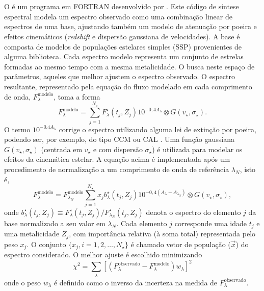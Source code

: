 \section{\STARLIGHT}
\label{sec:sample:SL}

O \starlight é um programa em FORTRAN desenvolvido por \citet{CidFernandes.etal.2005a}. Este código de síntese espectral modela um espectro observado como uma combinação linear de espectros de uma base, ajustando também um modelo de atenuação por poeira e efeitos cinemáticos ({\em redshift} e dispersão gaussiana de velocidades). A base é composta de modelos de populações estelares simples (SSP) provenientes de alguma biblioteca. Cada espectro modelo representa um conjunto de estrelas formadas ao mesmo tempo com a mesma metalicidade. O \starlight busca neste espaço de parâmetros, aqueles que melhor ajustem o espectro observado. O espectro resultante, representado pela equação do fluxo modelado em cada comprimento de onda, $F^{\mathrm{modelo}}_\lambda$, toma a forma
\begin{equation}
  F^{\mathrm{modelo}}_\lambda = \sum_{j=1}^{N_\star} F^\star_\lambda(t_j,Z_j) 10^{ -0,4 A_\lambda}  \otimes G(v_\star,\sigma_\star).
\end{equation}
\noindent O termo $10^{ -0.4 A_\lambda}$ corrige o espectro utilizando alguma lei de extinção por poeira, podendo ser, por exemplo, do tipo CCM \citep{CCM1989a} ou CAL \citep{Calzetti.etal.1994a}. Uma função gaussiana $G(v_\star,\sigma_\star)$ (centrada em $v_\star$ e com dispersão $\sigma_\star$) é utilizada para modelar os efeitos da cinemática estelar. A equação acima é implementada após um procedimento de normalização a um comprimento de onda de referência $\lambda_N$, isto é,
\begin{equation}
F^{\mathrm{modelo}}_\lambda = F^{\mathrm{modelo}}_{\lambda_N} \sum_{j=1}^{N_\star} x_j b^\star_\lambda(t_j,Z_j) 10^{ -0,4 (A_\lambda - A_{\lambda_N}) } \otimes G(v_\star,\sigma_\star),
\end{equation}
\noindent onde $b^\star_\lambda(t_j,Z_j) \equiv  F^\star_\lambda(t_j,Z_j) / F^\star_{\lambda_N}(t_j,Z_j)$ denota o espectro  do elemento $j$ da base normalizado a seu valor em $\lambda_N$. Cada elemento $j$ corresponde uma idade  $t_j$ e uma metalicidade $Z_j$, com importância relativa (à soma total) representada pelo peso $x_j$. O conjunto $\{x_j, i=1,2,\ldots,N_\star\}$ é chamado vetor de população ($\vec{x}$) do espectro considerado. O melhor ajuste é escolhido minimizando
\begin{equation}
\chi^2 = \sum_\lambda \left[(F^{\mathrm{observado}}_\lambda - F^{\mathrm{modelo}}_\lambda) w_\lambda\right]^2
\end{equation}
\noindent onde o peso $w_\lambda$ é definido como o inverso da incerteza na medida de $F_\lambda^{\mathrm{observado}}$.

